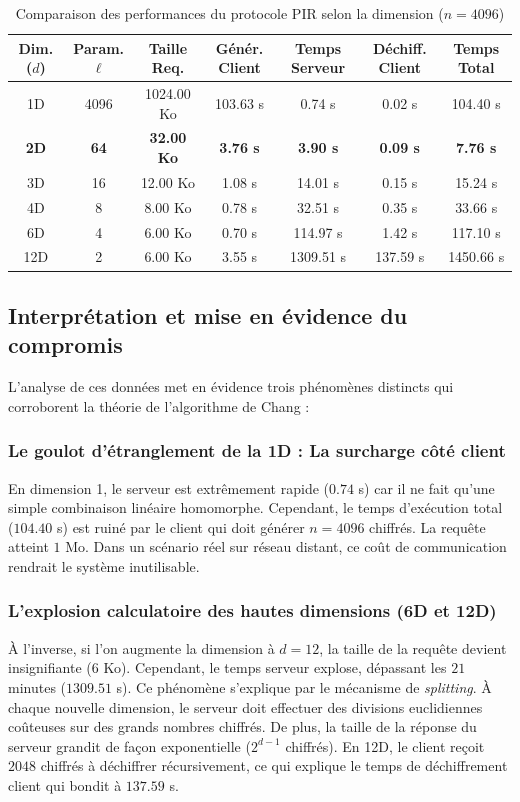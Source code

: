\documentclass[12pt,a4paper]{report}
\begin{document}
\begin{table}[h]
\centering
\begin{tabular}{|c|c|c|c|c|c|c|}
\hline
\textbf{Dim. ($d$)} & \textbf{Param. $\ell$} & \textbf{Taille Req.} & \textbf{Génér. Client} & \textbf{Temps Serveur} & \textbf{Déchiff. Client} & \textbf{Temps Total} \\ \hline
1D & 4096 & 1024.00 Ko & 103.63 s & 0.74 s & 0.02 s & 104.40 s \\ \hline
\textbf{2D} & \textbf{64} & \textbf{32.00 Ko} & \textbf{3.76 s} & \textbf{3.90 s} & \textbf{0.09 s} & \textbf{7.76 s} \\ \hline
3D & 16 & 12.00 Ko & 1.08 s & 14.01 s & 0.15 s & 15.24 s \\ \hline
4D & 8 & 8.00 Ko & 0.78 s & 32.51 s & 0.35 s & 33.66 s \\ \hline
6D & 4 & 6.00 Ko & 0.70 s & 114.97 s & 1.42 s & 117.10 s \\ \hline
12D & 2 & 6.00 Ko & 3.55 s & 1309.51 s & 137.59 s & 1450.66 s \\ \hline
\end{tabular}
\caption{Comparaison des performances du protocole PIR selon la dimension ($n=4096$)}
\label{tab:pir_results}
\end{table}

\subsection{Interprétation et mise en évidence du compromis}

L'analyse de ces données met en évidence trois phénomènes distincts qui corroborent la théorie de l'algorithme de Chang :

\subsubsection{Le goulot d'étranglement de la 1D : La surcharge côté client}
En dimension 1, le serveur est extrêmement rapide ($0.74$ s) car il ne fait qu'une simple combinaison linéaire homomorphe. Cependant, le temps d'exécution total ($104.40$ s) est ruiné par le client qui doit générer $n=4096$ chiffrés. La requête atteint $1$ Mo. Dans un scénario réel sur réseau distant, ce coût de communication rendrait le système inutilisable.

\subsubsection{L'explosion calculatoire des hautes dimensions (6D et 12D)}
À l'inverse, si l'on augmente la dimension à $d=12$, la taille de la requête devient insignifiante ($6$ Ko). Cependant, le temps serveur explose, dépassant les $21$ minutes ($1309.51$ s). Ce phénomène s'explique par le mécanisme de \textit{splitting}. À chaque nouvelle dimension, le serveur doit effectuer des divisions euclidiennes coûteuses sur des grands nombres chiffrés. De plus, la taille de la réponse du serveur grandit de façon exponentielle ($2^{d-1}$ chiffrés). En 12D, le client reçoit $2048$ chiffrés à déchiffrer récursivement, ce qui explique le temps de déchiffrement client qui bondit à $137.59$ s.
\end{document}
